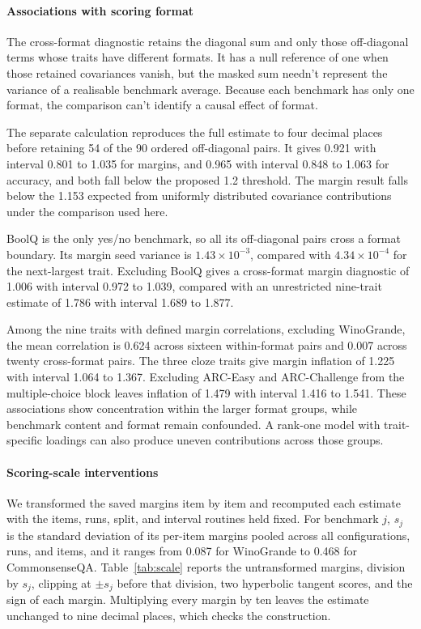 \paragraph{Associations with scoring format}
The cross-format diagnostic retains the diagonal sum and only those off-diagonal terms whose traits have different formats. It has a null reference of one when those retained covariances vanish, but the masked sum needn't represent the variance of a realisable benchmark average. Because each benchmark has only one format, the comparison can't identify a causal effect of format.

The separate calculation reproduces the full estimate to four decimal places before retaining 54 of the 90 ordered off-diagonal pairs. It gives 0.921 with interval 0.801 to 1.035 for margins, and 0.965 with interval 0.848 to 1.063 for accuracy, and both fall below the proposed 1.2 threshold. The margin result falls below the 1.153 expected from uniformly distributed covariance contributions under the comparison used here.

BoolQ is the only yes/no benchmark, so all its off-diagonal pairs cross a format boundary. Its margin seed variance is $1.43\times10^{-3}$, compared with $4.34\times10^{-4}$ for the next-largest trait. Excluding BoolQ gives a cross-format margin diagnostic of 1.006 with interval 0.972 to 1.039, compared with an unrestricted nine-trait estimate of 1.786 with interval 1.689 to 1.877.

Among the nine traits with defined margin correlations, excluding WinoGrande, the mean correlation is 0.624 across sixteen within-format pairs and 0.007 across twenty cross-format pairs. The three cloze traits give margin inflation of 1.225 with interval 1.064 to 1.367. Excluding ARC-Easy and ARC-Challenge from the multiple-choice block leaves inflation of 1.479 with interval 1.416 to 1.541. These associations show concentration within the larger format groups, while benchmark content and format remain confounded. A rank-one model with trait-specific loadings can also produce uneven contributions across those groups.

\paragraph{Scoring-scale interventions}
\label{app:scale}
We transformed the saved margins item by item and recomputed each estimate with the items, runs, split, and interval routines held fixed. For benchmark $j$, $s_j$ is the standard deviation of its per-item margins pooled across all configurations, runs, and items, and it ranges from 0.087 for WinoGrande to 0.468 for CommonsenseQA. Table~\ref{tab:scale} reports the untransformed margins, division by $s_j$, clipping at $\pm s_j$ before that division, two hyperbolic tangent scores, and the sign of each margin. Multiplying every margin by ten leaves the estimate unchanged to nine decimal places, which checks the construction.

